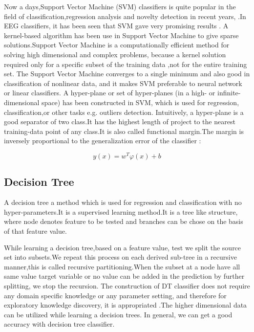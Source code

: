 Now a days,Support Vector Machine (SVM) classifiers is quite popular in the field of classification,regression analysis and novelty detection  in recent years,  \cite{bishop2006pattern} \cite{xie2008research}.In EEG classifiers, it has been seen that SVM gave very promising results  \cite{lal2004support}. A kernel-based algorithm has been use in Support Vector Machine to give sparse solutions.Support Vector Machine is a computationally efficient method for solving high dimensional  and complex problems, because a  kernel solution required  only for a specific subset of the training data ,not for  the entire training set.  The Support Vector Machine converges to a single minimum and also good in classification of  nonlinear data, and it makes SVM preferable to  neural network or linear  classifiers. A hyper-plane or set of hyper-planes (in a high- or infinite-dimensional space) has been constructed in SVM, which is used for  regression, classification,or other tasks e.g. outliers detection. Intuitively, a hyper-plane is a  good separator of two class.It has the highest length of project to the nearest training-data point of any class.It is also called functional margin.The  margin is inversely proportional to  the generalization error of the classifier  \cite{bishop2006pattern}:

\begin{equation}
    y(x)=w^T\varphi(x)+b 
\end{equation}

\subsection{Decision Tree}
A decision tree a method which is used for regression and classification with no hyper-parameters.It is a supervised learning method.It is a tree like structure, where node denotes feature to be tested and branches can be chose on the basis of that feature value. 

While learning a decision tree,based on a feature value, test we split the source set into subsets.We repeat this process on each derived sub-tree in a recursive manner,this is called recursive partitioning.When the subset at a node have all same value target variable or no value can be added in the prediction by further splitting, we stop the recursion. The construction of DT classifier does not require any  domain specific knowledge or any parameter setting, and therefore for exploratory knowledge discovery, it is appropriated .The higher dimensional data can be utilized while learning a decision trees. In general, we can get a good accuracy with decision tree classifier.


